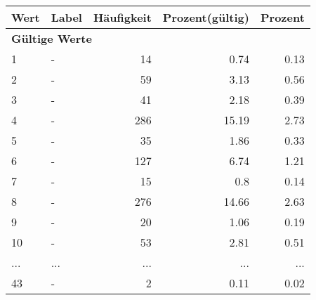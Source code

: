      \begin{longtable}{lXrrr}
     \toprule
     \textbf{Wert} & \textbf{Label} & \textbf{Häufigkeit} & \textbf{Prozent(gültig)} & \textbf{Prozent} \\
     \endhead
     \midrule
     \multicolumn{5}{l}{\textbf{Gültige Werte}}\\
        1 & \multicolumn{1}{X}{-} & %
          \num{14} &
          \num[round-mode=places,round-precision=2]{0,74} &
          \num[round-mode=places,round-precision=2]{0,13} \\
        2 & \multicolumn{1}{X}{-} & %
          \num{59} &
          \num[round-mode=places,round-precision=2]{3,13} &
          \num[round-mode=places,round-precision=2]{0,56} \\
        3 & \multicolumn{1}{X}{-} & %
          \num{41} &
          \num[round-mode=places,round-precision=2]{2,18} &
          \num[round-mode=places,round-precision=2]{0,39} \\
        4 & \multicolumn{1}{X}{-} & %
          \num{286} &
          \num[round-mode=places,round-precision=2]{15,19} &
          \num[round-mode=places,round-precision=2]{2,73} \\
        5 & \multicolumn{1}{X}{-} & %
          \num{35} &
          \num[round-mode=places,round-precision=2]{1,86} &
          \num[round-mode=places,round-precision=2]{0,33} \\
        6 & \multicolumn{1}{X}{-} & %
          \num{127} &
          \num[round-mode=places,round-precision=2]{6,74} &
          \num[round-mode=places,round-precision=2]{1,21} \\
        7 & \multicolumn{1}{X}{-} & %
          \num{15} &
          \num[round-mode=places,round-precision=2]{0,8} &
          \num[round-mode=places,round-precision=2]{0,14} \\
        8 & \multicolumn{1}{X}{-} & %
          \num{276} &
          \num[round-mode=places,round-precision=2]{14,66} &
          \num[round-mode=places,round-precision=2]{2,63} \\
        9 & \multicolumn{1}{X}{-} & %
          \num{20} &
          \num[round-mode=places,round-precision=2]{1,06} &
          \num[round-mode=places,round-precision=2]{0,19} \\
        10 & \multicolumn{1}{X}{-} & %
          \num{53} &
          \num[round-mode=places,round-precision=2]{2,81} &
          \num[round-mode=places,round-precision=2]{0,51} \\
       ... & ... & ... & ... & ... \\
        43 & \multicolumn{1}{X}{-} & %
          \num{2} &
          \num[round-mode=places,round-precision=2]{0,11} &
          \num[round-mode=places,round-precision=2]{0,02} \\


\end{longtable}
